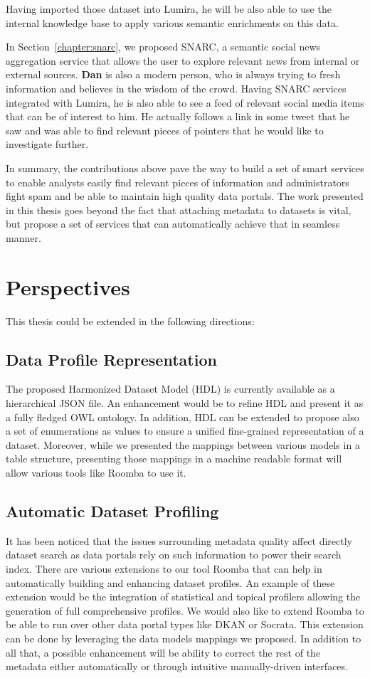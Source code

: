 \documentclass[a4paper,11pt,twoside]{ThesisStyle}
\begin{document}
Having imported those dataset into Lumira, he will be also able to use the internal knowledge base to apply various semantic enrichments on this data.

In Section~\ref{chapter:snarc}, we proposed SNARC, a semantic social news aggregation service that allows the user to explore relevant news from internal or external sources. \textbf{Dan} is also a modern person, who is always trying to fresh information and believes in the wisdom of the crowd. Having SNARC services integrated with Lumira, he is also able to see a feed of relevant social media items that can be of interest to him. He actually follows a link in some tweet that he saw and was able to find relevant pieces of pointers that he would like to investigate further.

In summary, the contributions above pave the way to build a set of smart services to enable analysts easily find relevant pieces of information and administrators fight spam and be able to maintain high quality data portals. The work presented in this thesis goes beyond the fact that attaching metadata to datasets is vital, but propose a set of services that can automatically achieve that in seamless manner.

\section{Perspectives}

This thesis could be extended in the following directions:

\subsection{Data Profile Representation}
The proposed Harmonized Dataset Model (HDL) is currently available as a hierarchical JSON file. An enhancement would be to refine HDL and present it as a fully fledged OWL ontology. In addition, HDL can be extended to propose also a set of enumerations as values to ensure a unified fine-grained representation of a dataset. Moreover, while we presented the mappings between various models in a table structure, presenting those mappings in a machine readable format will allow various tools like Roomba to use it.

\subsection{Automatic Dataset Profiling}
It has been noticed that the issues surrounding metadata quality affect directly dataset search as data portals rely on such information to power their search index. There are various extensions to our tool Roomba that can help in automatically building and enhancing dataset profiles. An example of these extension would be the integration of statistical and topical profilers allowing the generation of full comprehensive profiles. We would also like to extend Roomba to be able to run over other data portal types like DKAN or Socrata. This extension can be done by leveraging the data models mappings we proposed. In addition to all that, a possible enhancement will be ability to correct the rest of the metadata either automatically or through intuitive manually-driven interfaces.
\end{document}
